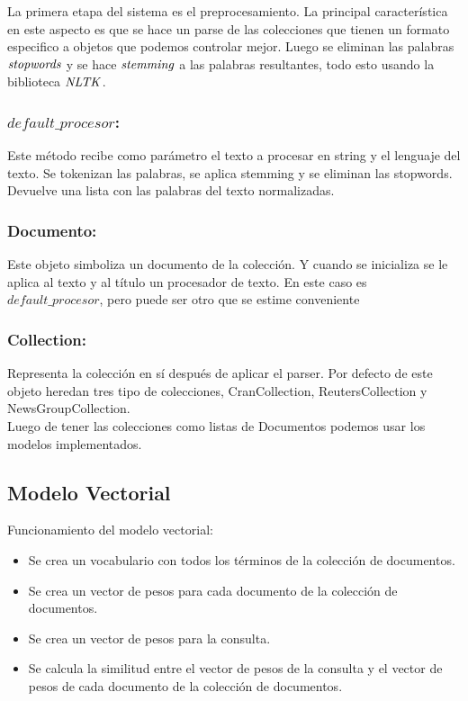 \documentclass{llncs}
\begin{document}
	La primera etapa del sistema es el preprocesamiento. La principal caracter\'istica en este aspecto es que se hace un parse de las colecciones que tienen un formato especifico a objetos que podemos controlar mejor. Luego se eliminan las palabras $\it{stopwords}$ y se hace $\it{stemming}$ a las palabras resultantes, todo esto usando la biblioteca $\it{NLTK}$.
	
	\subsubsection{$default\_procesor$:}
	
	Este m\'etodo recibe como par\'ametro el texto a procesar en string y el lenguaje del texto. Se tokenizan las palabras, se aplica stemming y se eliminan las stopwords. Devuelve una lista con las palabras del texto normalizadas.
	
	\subsubsection{Documento:}
	
	Este objeto simboliza un documento de la colecci\'on. Y cuando se inicializa se le aplica al texto y al t\'itulo un procesador de texto. En este caso es $default\_procesor$, pero puede ser otro que se estime conveniente
	
	\subsubsection{Collection:}
	
	Representa la colecci\'on en s\'i despu\'es de aplicar el parser. Por defecto de este objeto heredan tres tipo de colecciones, CranCollection, ReutersCollection y NewsGroupCollection.\\
	
	Luego de tener las colecciones como listas de Documentos podemos usar los modelos implementados.

	\subsection{Modelo Vectorial}
	Funcionamiento del modelo vectorial:\\
	\begin{itemize}
		\item Se crea un vocabulario con todos los t\'erminos de la colecci\'on de documentos.
		\item Se crea un vector de pesos para cada documento de la colecci\'on de documentos.
		\item Se crea un vector de pesos para la consulta.
		\item Se calcula la similitud entre el vector de pesos de la consulta y el vector de pesos de cada documento de la colecci\'on de documentos.
	\end{itemize}
\end{document}
